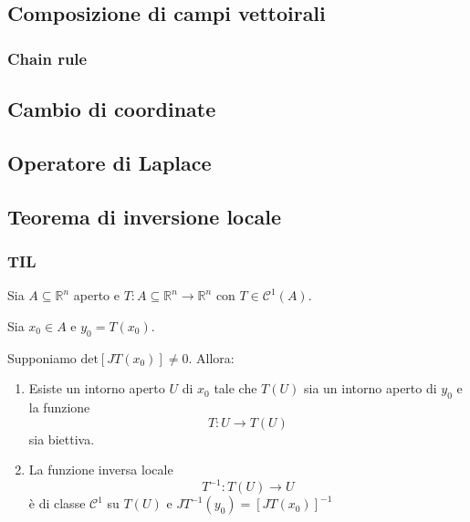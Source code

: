 \documentclass[x11names]{article}
\begin{document}
	\subsection{Composizione di campi vettoirali}
	\begin{center}
	\colorbox{myred}{\begin{minipage}{5.75in}
		\begin{redes}{}
		\subsubsection{Chain rule}
		\end{redes}
	\end{minipage}}        
	\end{center}

	\subsection{Cambio di coordinate}

	\subsection{Operatore di Laplace}

	\subsection{Teorema di inversione locale}
	\begin{center}
	\colorbox{myred}{\begin{minipage}{5.75in}
		\begin{redes}{}
		\subsubsection{TIL}
		Sia \(A \subseteq \mathbb{R}^n\) aperto e \(T:A\subseteq \mathbb{R}^n \to \mathbb{R}^n\) con \(T\in \mathcal{C}^1(A)\). 
		
		Sia \(x_{0} \in A\) e \(y_{0} = T(x_{0})\).
		
		Supponiamo \(\text{det}\left[JT(x_{0})\right] \neq 0\). Allora:
		\begin{enumerate}
			\item Esiste un intorno aperto \(U\) di \(x_{0}\) tale che \(T(U)\) sia un intorno aperto di \(y_{0}\) e la funzione
			\[ 
			T: U \to T(U)
			\]
			sia biettiva.
			\item La funzione inversa locale 
			\[ 
			T^{-1}: T(U) \to U
			\]
			è di classe \(\mathcal{C}^1\) su \(T(U)\) e \(JT^{-1}(y_{0}) = \left[JT(x_{0})\right]^{-1}\)
		\end{enumerate}
		\end{redes}
	\end{minipage}}        
	\end{center}
\end{document}
